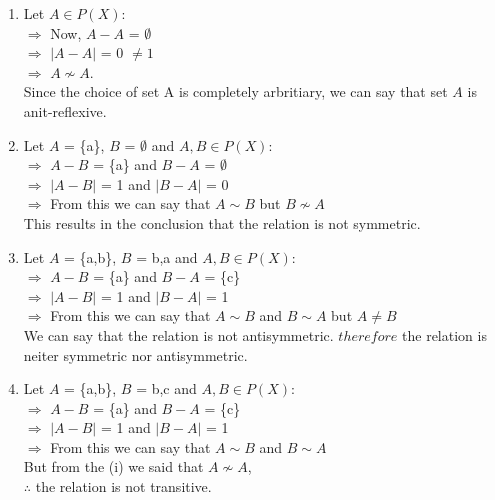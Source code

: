 \documentclass{article}
\begin{document}
\begin{enumerate}
\begin{enumerate}
\begin{enumerate}
        \item Let $A \in P(X)$:\\
              $\Rightarrow$ Now, $A - A$ = $\emptyset$\\
              $\Rightarrow$ $\left\lvert A - A\right\rvert$ = 0 $\neq 1$\\
              $\Rightarrow$ $A \nsim A$.\\
              Since the choice of set A is completely arbritiary, we can say that set $A$ is anit-reflexive.\\

        \item Let $A$ = \{a\}, $B$ = $\emptyset$ and $A,B \in P(X)$:\\
             $\Rightarrow$ $A-B$ = \{a\} and $B-A$ = $\emptyset$\\
             $\Rightarrow$ $\left\lvert A - B\right\rvert$ = 1 and $\left\lvert B - A\right\rvert$ = 0\\
             $\Rightarrow$ From this we can say that $A \sim B$ but $B \nsim A$\\
             This results in the conclusion that the relation is not symmetric.\\

        \item Let $A$ = \{a,b\}, $B$ = {b,a} and $A,B \in P(X)$:\\
             $\Rightarrow$ $A-B$ = \{a\} and $B-A$ = \{c\} \\
             $\Rightarrow$ $\left\lvert A - B\right\rvert$ = 1 and $\left\lvert B - A\right\rvert$ = 1\\
             $\Rightarrow$ From this we can say that $A \sim B$ and $B \sim A$ but $A \neq B$\\
             We can say that the relation is not antisymmetric. $therefore$ the relation is neiter symmetric nor antisymmetric.\\

        \item Let $A$ = \{a,b\}, $B$ = {b,c} and $A,B \in P(X)$:\\
             $\Rightarrow$ $A-B$ = \{a\} and $B-A$ = \{c\} \\
             $\Rightarrow$ $\left\lvert A - B\right\rvert$ = 1 and $\left\lvert B - A\right\rvert$ = 1\\
             $\Rightarrow$ From this we can say that $A \sim B$ and $B \sim A$\\
             But from the (i) we said that $A \nsim A$,\\ $\therefore$ the relation is not transitive.
            \end{enumerate}


\end{enumerate}
\end{enumerate}
\end{document}
